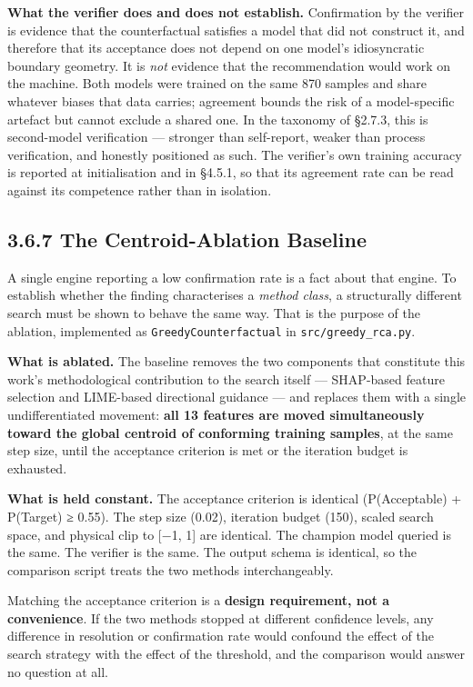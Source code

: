 \textbf{What the verifier does and does not establish.} Confirmation by the verifier is evidence that the counterfactual satisfies a model that did not construct it, and therefore that its acceptance does not depend on one model's idiosyncratic boundary geometry. It is \emph{not} evidence that the recommendation would work on the machine. Both models were trained on the same 870 samples and share whatever biases that data carries; agreement bounds the risk of a model-specific artefact but cannot exclude a shared one. In the taxonomy of §2.7.3, this is second-model verification --- stronger than self-report, weaker than process verification, and honestly positioned as such. The verifier's own training accuracy is reported at initialisation and in §4.5.1, so that its agreement rate can be read against its competence rather than in isolation.

\hypertarget{the-centroid-ablation-baseline}{%
\subsection{3.6.7 The Centroid-Ablation Baseline}\label{the-centroid-ablation-baseline}}

A single engine reporting a low confirmation rate is a fact about that engine. To establish whether the finding characterises a \emph{method class}, a structurally different search must be shown to behave the same way. That is the purpose of the ablation, implemented as \texttt{GreedyCounterfactual} in \texttt{src/greedy\_rca.py}.

\textbf{What is ablated.} The baseline removes the two components that constitute this work's methodological contribution to the search itself --- SHAP-based feature selection and LIME-based directional guidance --- and replaces them with a single undifferentiated movement: \textbf{all 13 features are moved simultaneously toward the global centroid of conforming training samples}, at the same step size, until the acceptance criterion is met or the iteration budget is exhausted.

\textbf{What is held constant.} The acceptance criterion is identical (P(Acceptable) + P(Target) ≥ 0.55). The step size (0.02), iteration budget (150), scaled search space, and physical clip to {[}−1, 1{]} are identical. The champion model queried is the same. The verifier is the same. The output schema is identical, so the comparison script treats the two methods interchangeably.

Matching the acceptance criterion is a \textbf{design requirement, not a convenience}. If the two methods stopped at different confidence levels, any difference in resolution or confirmation rate would confound the effect of the search strategy with the effect of the threshold, and the comparison would answer no question at all.

